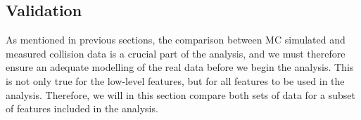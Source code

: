\subsection*{Validation}\label{subsec:Validation}
As mentioned in previous sections, the comparison between \ac{MC} simulated and measured collision data is a crucial part of the 
analysis, and we must therefore ensure an adequate modelling of the real data before we begin the analysis. This is not only 
true for the low-level features, but for all features to be used in the analysis. Therefore, 
we will in this section compare both sets of data for a subset of features included in the analysis.
\begin{figure}[H]
    \renewcommand\figurename{Table}
    \centering
\end{figure}
